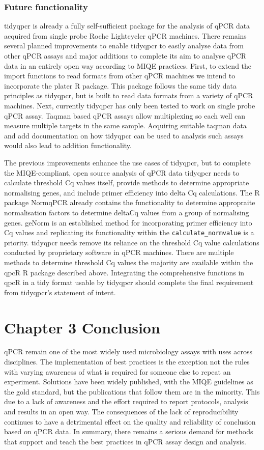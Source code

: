 \documentclass{SBCbookchapter}
\begin{document}
\subsubsection{Future functionality}

tidyqpcr is already a fully self-sufficient package for the analysis of qPCR data acquired from single probe Roche Lightcycler qPCR machines. There remains several planned improvements to enable tidyqpcr to easily analyse data from other qPCR assays and major additions to complete its aim to analyse qPCR data in an entirely open way according to MIQE practices. First, to extend the import functions to read formats from other qPCR machines we intend to incorporate the plater R package. This package follows the same tidy data principles as tidyqpcr, but is built to read data formats from a variety of qPCR machines. Next, currently tidyqpcr has only been tested to work on single probe qPCR assay. Taqman based qPCR assays allow multiplexing so each well can measure multiple targets in the same sample. Acquiring suitable taqman data and add documentation on how tidyqpcr can be used to analysis such assays would also lead to addition functionality. 

The previous improvements enhance the use cases of tidyqpcr, but to complete the MIQE-compliant, open source analysis of qPCR data tidyqpcr needs to calculate threshold Cq values itself, provide methods to determine appropriate normalising genes, and include primer efficiency into delta Cq calculations. The R package NormqPCR already contains the functionality to determine appropraite normalisation factors to determine deltaCq values from a group of normalising genes. geNorm is an established method for incorporating primer efficiency into Cq values and replicating its functionality within the \lstinline{calculate_normvalue} is a priority. tidyqpcr needs remove its reliance on the threshold Cq value calculations conducted by proprietary software in qPCR machines. There are multiple methods to determine threshold Cq values the majority are available within the qpcR R package described above. Integrating the comprehensive functions in qpcR in a tidy format usable by tidyqpcr should complete the final requirement from tidyqpcr's statement of intent. 

\section{Chapter 3 Conclusion}

qPCR remain one of the most widely used microbiology assays with uses across disciplines. The implementation of best practices is the exception not the rules with varying awareness of what is required for someone else to repeat an experiment. Solutions have been widely published, with the MIQE guidelines as the gold standard, but the publications that follow them are in the minority. This due to a lack of awareness and the effort required to report protocols, analysis and results in an open way. The consequences of the lack of reproducibility continues to have a detrimental effect on the quality and reliability of conclusion based on qPCR data. In summary, there remains a serious demand for methods that support and teach the best practices in qPCR assay design and analysis.
\end{document}
